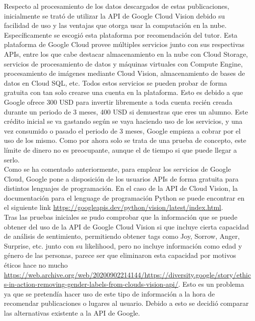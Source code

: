 Respecto al procesamiento de los datos descargados de estas publicaciones, inicialmente se trató de utilizar la API de Google Cloud Vision debido su facilidad de uso y las ventajas que otorga usar la computación en la nube. Específicamente se escogió esta plataforma por recomendación del tutor. Esta plataforma de Google Cloud provee múltiples servicios junto con sus respectivas APIs, entre los que cabe destacar almacenamiento en la nube con Cloud Storage, servicios de procesamiento de datos y máquinas virtuales con Compute Engine, procesamiento de imágenes mediante Cloud Vision, almacenamiento de bases de datos en Cloud SQL, etc. Todos estos servicios se pueden probar de forma gratuita con tan solo crearse una cuenta en la plataforma. Esto es debido a  que Google ofrece 300 USD para invertir libremente a toda cuenta recién creada durante un periodo de 3 meses, 400 USD si demuestras que eres un alumno. Este crédito inicial se va gastando según se vaya haciendo uso de los servicios, y una vez consumido o pasado el periodo de 3 meses, Google empieza a cobrar por el uso de los mismo. Como por ahora solo se trata de una prueba de concepto, este límite de dinero no es preocupante, aunque el de tiempo si que puede llegar a serlo.\\

Como se ha comentado anteriormente, para emplear los servicios de Google Cloud, Google pone a disposición de los usuarios APIs de forma gratuita para distintos lenguajes de programación. En el caso de la API de Cloud Vision, la documentación para el lenguage de programación Python se puede encontrar en el siguiente link \url{https://googleapis.dev/python/vision/latest/index.html}.\\

Tras las pruebas iniciales se pudo comprobar que la información que se puede obtener del uso de la API de Google Cloud Vision si que incluye cierta capacidad de análisis de sentimiento, permitiendo obtener tags como Joy, Sorrow, Anger, Surprise, etc. junto con su likelihood, pero no incluye información como edad y género de las personas, parece ser que eliminaron esta capacidad por motivos éticos hace no mucho \url{https://web.archive.org/web/20200902214144/https://diversity.google/story/ethics-in-action-removing-gender-labels-from-clouds-vision-api/}. Esto es un problema ya que se pretendía hacer uso de este tipo de información a la hora de recomendar publicaciones o lugares al usuario. Debido a esto se decidió comparar las alternativas existente a la API de Google.\\

